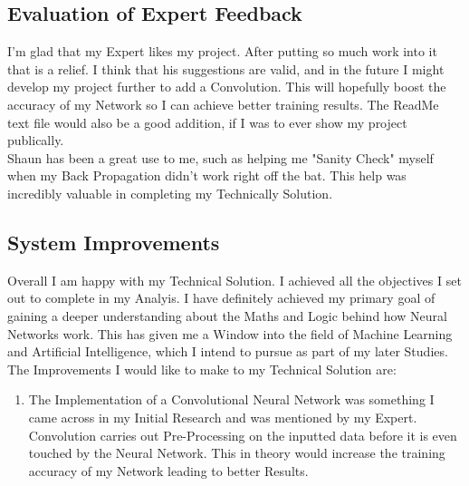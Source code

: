 \begin{flushleft}
\begin{enumerate}
                \vspace{0.5cm}
        \end{enumerate}

        \vspace{0.5cm}
    \subsection{Evaluation of Expert Feedback}
        \vspace{0.2cm}
        I'm glad that my Expert likes my project. After putting so much work into it that is a relief. I think that his suggestions are valid, and
        in the future I might develop my project further to add a Convolution. This will hopefully boost the accuracy of my Network so I can achieve
        better training results. The ReadMe text file would also be a good addition, if I was to ever show my project publically. \\
        \vspace{0.2cm}
        Shaun has been a great use to me, such as helping me "Sanity Check" myself when my Back Propagation didn't work right off the bat. This
        help was incredibly valuable in completing my Technically Solution. \\
        \vspace{0.5cm}
    \subsection{System Improvements}
        \vspace{0.2cm}
        Overall I am happy with my Technical Solution. I achieved all the objectives I set out to complete in my Analyis. I have definitely achieved
        my primary goal of gaining a deeper understanding about the Maths and Logic behind how Neural Networks work. This has given me a Window into
        the field of Machine Learning and Artificial Intelligence, which I intend to pursue as part of my later Studies. \\
        \vspace{0.2cm}
        The Improvements I would like to make to my Technical Solution are: \\
        \vspace{0.5cm}

        \begin{enumerate}
            \item The Implementation of a Convolutional Neural Network was something I came across in my Initial Research and was mentioned by my Expert.
            Convolution carries out Pre-Processing on the inputted data before it is even touched by the Neural Network. This in theory would increase
            the training accuracy of my Network leading to better Results. \\
            

\end{enumerate}
\end{flushleft}
